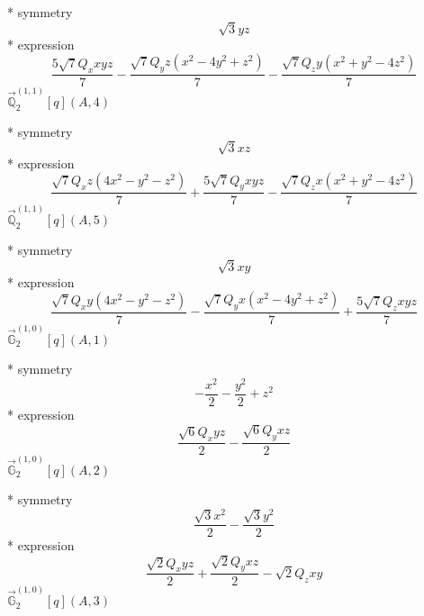 \documentclass[fleqn,8pt]{jsarticle}
\begin{document}
\noindent\quad ** symmetry
\begin{dmath*}
\sqrt{3} y z
\end{dmath*}
\noindent\quad ** expression
\begin{dmath*}
\frac{5 \sqrt{7} Q_{x} x y z}{7} - \frac{\sqrt{7} Q_{y} z \left(x^{2} - 4 y^{2} + z^{2}\right)}{7} - \frac{\sqrt{7} Q_{z} y \left(x^{2} + y^{2} - 4 z^{2}\right)}{7}
\end{dmath*}
\noindent\quad $\vec{\mathbb{Q}}_{2}^{(1,1)}[q](A,4)$

\noindent\quad ** symmetry
\begin{dmath*}
\sqrt{3} x z
\end{dmath*}
\noindent\quad ** expression
\begin{dmath*}
\frac{\sqrt{7} Q_{x} z \left(4 x^{2} - y^{2} - z^{2}\right)}{7} + \frac{5 \sqrt{7} Q_{y} x y z}{7} - \frac{\sqrt{7} Q_{z} x \left(x^{2} + y^{2} - 4 z^{2}\right)}{7}
\end{dmath*}
\noindent\quad $\vec{\mathbb{Q}}_{2}^{(1,1)}[q](A,5)$

\noindent\quad ** symmetry
\begin{dmath*}
\sqrt{3} x y
\end{dmath*}
\noindent\quad ** expression
\begin{dmath*}
\frac{\sqrt{7} Q_{x} y \left(4 x^{2} - y^{2} - z^{2}\right)}{7} - \frac{\sqrt{7} Q_{y} x \left(x^{2} - 4 y^{2} + z^{2}\right)}{7} + \frac{5 \sqrt{7} Q_{z} x y z}{7}
\end{dmath*}
\noindent\quad $\vec{\mathbb{G}}_{2}^{(1,0)}[q](A,1)$

\noindent\quad ** symmetry
\begin{dmath*}
- \frac{x^{2}}{2} - \frac{y^{2}}{2} + z^{2}
\end{dmath*}
\noindent\quad ** expression
\begin{dmath*}
\frac{\sqrt{6} Q_{x} y z}{2} - \frac{\sqrt{6} Q_{y} x z}{2}
\end{dmath*}
\noindent\quad $\vec{\mathbb{G}}_{2}^{(1,0)}[q](A,2)$

\noindent\quad ** symmetry
\begin{dmath*}
\frac{\sqrt{3} x^{2}}{2} - \frac{\sqrt{3} y^{2}}{2}
\end{dmath*}
\noindent\quad ** expression
\begin{dmath*}
\frac{\sqrt{2} Q_{x} y z}{2} + \frac{\sqrt{2} Q_{y} x z}{2} - \sqrt{2} Q_{z} x y
\end{dmath*}
\noindent\quad $\vec{\mathbb{G}}_{2}^{(1,0)}[q](A,3)$
\end{document}
